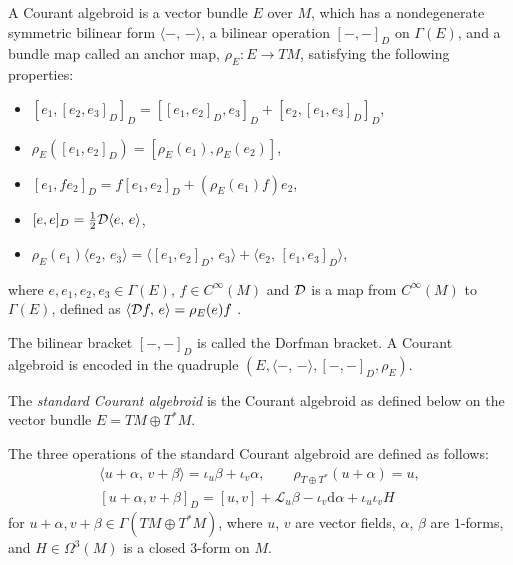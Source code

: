 \documentclass[10pt,a4paper]{amsart}
\numberwithin{equation}{section}
\newcommand{\calL}{{\mathcal L}}
\newcommand{\courant}[2]{{[{{#1},{#2}}]_D}}
\newcommand{\rhoe}{\rho_E}
\newcommand{\rhott}{\rho_{T \oplus T^*}}
\newcommand{\bracket}[2]{\langle #1,\,#2\rangle}
\newcommand{\rd}{\mathrm{d}}
\begin{document}
\begin{Definition}\label{courantdefinition}
A Courant algebroid is a vector bundle $E$ over $M$,
which has a nondegenerate symmetric bilinear form
$\bracket{-}{-}$, a bilinear operation $\courant{-}{-}$ on $\Gamma(E)$,
and a bundle map called an anchor map,
$\rhoe\colon E \longrightarrow TM$, satisfying the following properties:
\begin{itemize}\itemsep=0pt%
\item[(1)] $\courant{e_1}{\courant{e_2}{e_3}} = \courant{\courant{e_1}{e_2}}{e_3} + \courant{e_2}{\courant{e_1}{e_3}}$,
\item[(2)] $\rhoe(\courant{e_1}{e_2}) = [\rhoe(e_1), \rhoe(e_2)]$,
\item[(3)] $\courant{e_1}{f e_2} = f \courant{e_1}{e_2}
+ (\rhoe(e_1)f)e_2$,
\item[(4)] $\courant{e}{e} = \frac{1}{2} {\cal D} \bracket{e}{e}$,
\item[(5)] $\rhoe(e_1) \bracket{e_2}{e_3}
= \bracket{\courant{e_1}{e_2}}{e_3} + \bracket{e_2}{\courant{e_1}{e_3}}$,
\end{itemize}
where
$e, e_1, e_2, e_3 \in \Gamma(E)$, $f \in C^{\infty}(M)$ and
${\cal D}$ is a map from $C^{\infty}(M)$ to $\Gamma (E)$,
defined as
$\bracket{{\cal D}f}{e} = \rhoe(e) f$
\cite{LWX}.
\end{Definition}
The bilinear bracket $\courant{-}{-}$ is called the Dorfman bracket.
A Courant algebroid is encoded in the quadruple $(E, \bracket{-}{-}, \courant{-}{-}, \rhoe)$.

\begin{Example}\label{standardCA}
The \emph{standard Courant algebroid} is the Courant algebroid
as defined below on the vector bundle $E = TM \oplus T^*M$.

The three operations of the standard Courant algebroid
are defined as follows:
\begin{gather*}
	\bracket{u + \alpha}{v + \beta} = \iota_u \beta + \iota_v \alpha,\qquad
\rhott(u+\alpha) = u, \\
\courant{u + \alpha}{v + \beta} = [u, v] + \calL_u \beta - \iota_v \rd \alpha + \iota_u \iota_v H
\end{gather*}
for $u + \alpha, v + \beta \in \Gamma(TM \oplus T^*M)$,
where $u$, $v$ are vector fields, $\alpha$, $\beta$ are $1$-forms,
and $H \in \Omega^3(M)$ is a closed $3$-form on $M$.
\end{Example}
\end{document}
